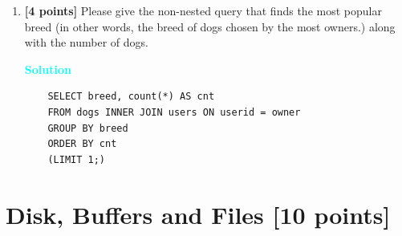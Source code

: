 \documentclass[10pt]{article}
\newenvironment{solution}
    { \begin{mdframed}[backgroundcolor=gray!10] \textcolor{cyan}{\textbf{Solution}} \\}
    {  \end{mdframed}}
\begin{document}
\begin{enumerate}
    \item \textbf{[4 points]}
    Please give the non-nested query that finds the most popular breed 
	(in other words, the breed of dogs chosen by the most owners.) along with the number of dogs.
	\begin{solution}
    \begin{verbatim}
    SELECT breed, count(*) AS cnt
    FROM dogs INNER JOIN users ON userid = owner
    GROUP BY breed
    ORDER BY cnt
    (LIMIT 1;)
    \end{verbatim}
 \end{solution}
    
\end{enumerate}
    

\newpage
\section{Disk, Buffers and Files \textbf{[10 points]}}
\end{document}

